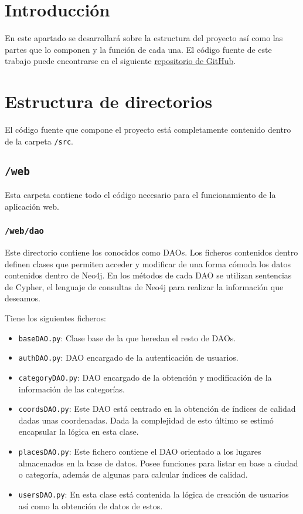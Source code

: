 
\section{Introducción}
En este apartado se desarrollará sobre la estructura del proyecto así como las partes que lo componen y la función de cada una. El código fuente de este trabajo puede encontrarse en el siguiente \href{https://github.com/mariohu2001/TFG-Urban-Street-Mapping-Transfer}{repositorio de GitHub}.
\section{Estructura de directorios}

El código fuente que compone el proyecto está completamente contenido dentro de la carpeta \texttt{/src}.

\subsection{\texttt{/web}}
Esta carpeta contiene todo el código necesario para el funcionamiento de la aplicación web.

\subsubsection{\texttt{/web/dao}}
Este directorio contiene los conocidos como DAOs. Los ficheros contenidos dentro definen clases que permiten acceder y modificar de una forma cómoda los datos contenidos dentro de Neo4j. En los métodos de cada DAO se utilizan sentencias de Cypher, el lenguaje de consultas de Neo4j para realizar la información que deseamos.

Tiene los siguientes ficheros:
\begin{itemize}
	\item \texttt{baseDAO.py}: Clase base de la que heredan el resto de DAOs.
	\item \texttt{authDAO.py}: DAO encargado de la autenticación de usuarios.
	\item \texttt{categoryDAO.py}: DAO encargado de la obtención y modificación de la información de las categorías.
	\item \texttt{coordsDAO.py}: Este DAO está centrado en la obtención de índices de calidad dadas unas coordenadas. Dada la complejidad de esto último se estimó encapsular la lógica en esta clase.
	\item \texttt{placesDAO.py}: Este fichero contiene el DAO orientado a los lugares almacenados en la base de datos. Posee funciones para listar en base a ciudad o categoría, además de algunas para calcular índices de calidad.
	\item \texttt{usersDAO.py}: En esta clase está contenida la lógica de creación de usuarios así como la obtención de datos de estos.
\end{itemize}

